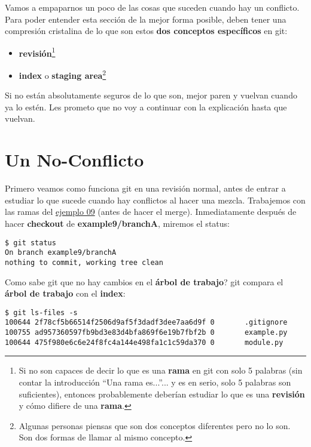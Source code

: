 
Vamos a empaparnos un poco de las cosas que suceden cuando hay un conflicto. Para poder entender esta sección de la mejor
forma posible, deben tener una compresión cristalina de lo que son estos {\bf dos conceptos específicos} en git:

\begin{itemize}
	\item {\bf revisión}\footnote{Si no son capaces de decir lo que es una {\bf rama} en git con solo 5 palabras
	(sin contar la introducción ``Una rama es...''... y es en serio, solo 5 palabras son suficientes),
	entonces probablemente deberían estudiar lo que es una {\bf revisión} y cómo difiere de una {\bf rama}.}
	\item {\bf index} o {\bf staging area}\footnote{Algunas personas piensas que son dos conceptos diferentes pero
	no lo son. Son dos formas de llamar al mismo concepto.}
\end{itemize}

Si no están absolutamente seguros de lo que son, mejor paren y vuelvan cuando ya lo estén. Les prometo que no voy a
continuar con la explicación hasta que vuelvan.

\section{Un No-Conflicto}
Primero veamos como funciona git en una revisión normal, antes de entrar a estudiar lo que sucede cuando hay conflictos
al hacer una mezcla. Trabajemos con las ramas del \hyperref[example_09]{ejemplo 09} (antes de hacer el merge). Inmediatamente
después de hacer {\bf checkout} de {\bf example9/branchA}, miremos el status:

\begin{lstlisting}[style=console_style,
	basicstyle=\small,
	caption={\bf git status} sobre un árbol limpio]
$ git status
On branch example9/branchA
nothing to commit, working tree clean
\end{lstlisting}

Como sabe git que no hay cambios en el {\bf árbol de trabajo}? git compara el {\bf árbol de trabajo} con el {\bf index}:

\begin{lstlisting}[style=console_style,
	basicstyle=\small,
	caption={\bf git ls-files} en un árbol limpio]
$ git ls-files -s
100644 2f78cf5b66514f2506d9af5f3dadf3dee7aa6d9f 0       .gitignore
100755 ad957360597fb9bd3e83d4bfa869f6e19b7fbf2b 0       example.py
100644 475f980e6c6e24f8fc4a144e498fa1c1c59da370 0       module.py
\end{lstlisting}


